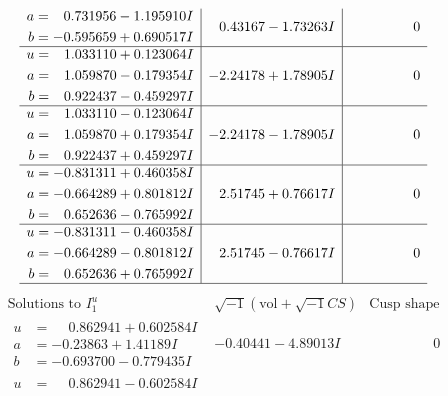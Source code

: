 \documentclass[1p]{elsarticle_modified}
\theoremstyle{definition}
\newcommand{\I}{\sqrt{-1}}
\begin{document}
$$\begin{array}{c|c|c}
\begin{aligned}
a &= \phantom{-}0.731956 - 1.195910 I \\
b &= -0.595659 + 0.690517 I\end{aligned}
 & \phantom{-}0.43167 - 1.73263 I & \phantom{-0.000000 } 0 \\ \hline\begin{aligned}
u &= \phantom{-}1.033110 + 0.123064 I \\
a &= \phantom{-}1.059870 - 0.179354 I \\
b &= \phantom{-}0.922437 - 0.459297 I\end{aligned}
 & -2.24178 + 1.78905 I & \phantom{-0.000000 } 0 \\ \hline\begin{aligned}
u &= \phantom{-}1.033110 - 0.123064 I \\
a &= \phantom{-}1.059870 + 0.179354 I \\
b &= \phantom{-}0.922437 + 0.459297 I\end{aligned}
 & -2.24178 - 1.78905 I & \phantom{-0.000000 } 0 \\ \hline\begin{aligned}
u &= -0.831311 + 0.460358 I \\
a &= -0.664289 + 0.801812 I \\
b &= \phantom{-}0.652636 - 0.765992 I\end{aligned}
 & \phantom{-}2.51745 + 0.76617 I & \phantom{-0.000000 } 0 \\ \hline\begin{aligned}
u &= -0.831311 - 0.460358 I \\
a &= -0.664289 - 0.801812 I \\
b &= \phantom{-}0.652636 + 0.765992 I\end{aligned}
 & \phantom{-}2.51745 - 0.76617 I & \phantom{-0.000000 } 0\\
 \hline 
 \end{array}$$\newpage$$\begin{array}{c|c|c}  
\text{Solutions to }I^u_{1}& \I (\text{vol} + \sqrt{-1}CS) & \text{Cusp shape}\\
 \hline 
\begin{aligned}
u &= \phantom{-}0.862941 + 0.602584 I \\
a &= -0.23863 + 1.41189 I \\
b &= -0.693700 - 0.779435 I\end{aligned}
 & -0.40441 - 4.89013 I & \phantom{-0.000000 } 0 \\ \hline\begin{aligned}
u &= \phantom{-}0.862941 - 0.602584 I \\

\end{aligned}
\end{array}$$
\end{document}
